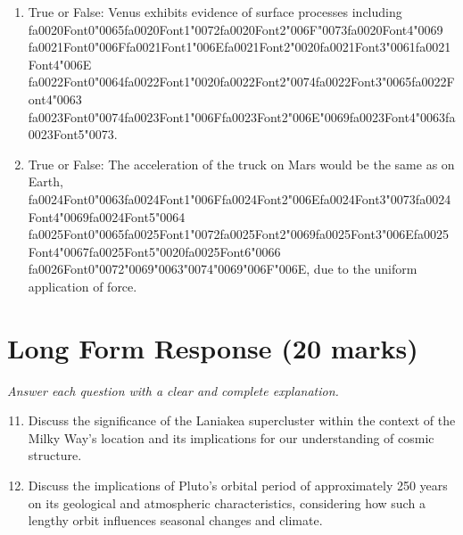 \documentclass[12pt]{article}
\begin{document}
\begin{enumerate}[label=\arabic*.]
\item True or False: Venus exhibits evidence of surface processes including {\csname fa0020Font0\endcsname\char"0065}{\csname fa0020Font1\endcsname\char"0072}{\csname fa0020Font2\endcsname\char"006F}{\char"0073}{\csname fa0020Font4\endcsname\char"0069} {\csname fa0021Font0\endcsname\char"006F}{\csname fa0021Font1\endcsname\char"006E}{\csname fa0021Font2\endcsname\char"0020}{\csname fa0021Font3\endcsname\char"0061}{\csname fa0021Font4\endcsname\char"006E} {\csname fa0022Font0\endcsname\char"0064}{\csname fa0022Font1\endcsname\char"0020}{\csname fa0022Font2\endcsname\char"0074}{\csname fa0022Font3\endcsname\char"0065}{\csname fa0022Font4\endcsname\char"0063} {\csname fa0023Font0\endcsname\char"0074}{\csname fa0023Font1\endcsname\char"006F}{\csname fa0023Font2\endcsname\char"006E}{\char"0069}{\csname fa0023Font4\endcsname\char"0063}{\csname fa0023Font5\endcsname\char"0073}.
\item True or False: The acceleration of the truck on Mars would be the same as on Earth, {\csname fa0024Font0\endcsname\char"0063}{\csname fa0024Font1\endcsname\char"006F}{\csname fa0024Font2\endcsname\char"006E}{\csname fa0024Font3\endcsname\char"0073}{\csname fa0024Font4\endcsname\char"0069}{\csname fa0024Font5\endcsname\char"0064} {\csname fa0025Font0\endcsname\char"0065}{\csname fa0025Font1\endcsname\char"0072}{\csname fa0025Font2\endcsname\char"0069}{\csname fa0025Font3\endcsname\char"006E}{\csname fa0025Font4\endcsname\char"0067}{\csname fa0025Font5\endcsname\char"0020}{\csname fa0025Font6\endcsname\char"0066} {\csname fa0026Font0\endcsname\char"0072}{\char"0069}{\char"0063}{\char"0074}{\char"0069}{\char"006F}{\char"006E}, due to the uniform application of force.
\end{enumerate}

\section*{Long Form Response (20 marks)}
\textit{Answer each question with a clear and complete explanation.}
\begin{enumerate}[label=\arabic*.]
\setcounter{enumi}{10}
\item Discuss the significance of the Laniakea supercluster within the context of the Milky
Way's location and its implications for our understanding of cosmic structure.
\item Discuss the implications of Pluto's orbital period of approximately 250 years on its
geological and atmospheric characteristics, considering how such a lengthy orbit
influences seasonal changes and climate.
\end{enumerate}
\end{document}
